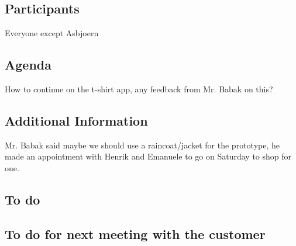 \subsection{Participants}

Everyone except Asbjoern


\subsection{Agenda}

How to continue on the t-shirt app, any feedback from Mr. Babak on this?


\subsection{Additional Information}

Mr. Babak said maybe we should use a raincoat/jacket for the prototype, he made an appointment with Henrik and Emanuele to go on Saturday to shop for one.

\subsection{To do}

\subsection{To do for next meeting with the customer}